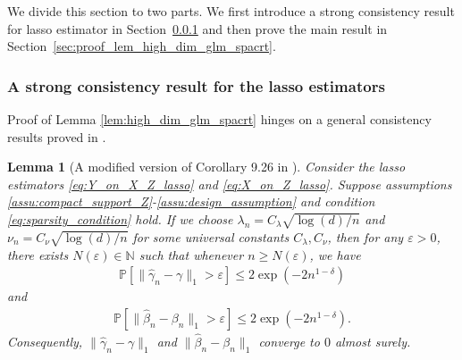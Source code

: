 \documentclass[12pt]{article}
\newtheorem{lemma}{Lemma}
\theoremstyle{definition}
\def\P{\mathbb{P}}
\def\P{\mathbb{P}}
\renewcommand{\P}{\mathbb{P}}							%
\begin{document}
We divide this section to two parts. We first introduce a strong consistency result for lasso estimator in Section~\ref{sec:strong_consistency_lasso} and then prove the main result in Section~\ref{sec:proof_lem_high_dim_glm_spacrt}.

\subsubsection{A strong consistency result for the lasso estimators}\label{sec:strong_consistency_lasso}

Proof of Lemma \ref{lem:high_dim_glm_spacrt} hinges on a general consistency results proved in \citep{Wainwright2019}.
  
  \begin{lemma}[A modified version of Corollary 9.26 in \citep{Wainwright2019}]\label{lem:oracle_inequality_lasso}
    Consider the lasso estimators \eqref{eq:Y_on_X_Z_lasso} and \eqref{eq:X_on_Z_lasso}. Suppose assumptions \ref{assu:compact_support_Z}-\ref{assu:design_assumption} and condition \eqref{eq:sparsity_condition} hold. If we choose $\lambda_n=C_{\lambda} \sqrt{\log(d)/n}$ and $\nu_n=C_{\nu}\sqrt{\log(d)/n}$ for some universal constants $C_\lambda,C_\nu$, then for any $\varepsilon>0$, there exists $N(\varepsilon)\in\mathbb{N}$ such that whenever $n\geq N(\varepsilon)$, we have 
    \begin{align*}
      \P[\|\widehat{\gamma}_n-\gamma\|_1>\varepsilon]\leq 2\exp(-2n^{1-\delta})
    \end{align*}
    and 
    \begin{align*}
      \P[\|\widehat{\beta}_n-\beta_n\|_1>\varepsilon]\leq 2\exp(-2n^{1-\delta}).
    \end{align*}
    Consequently, $\|\widehat{\gamma}_n-\gamma\|_1$ and $\|\widehat{\beta}_n-\beta_n\|_1$ converge to $0$ almost surely.
  \end{lemma}
  
\end{document}
